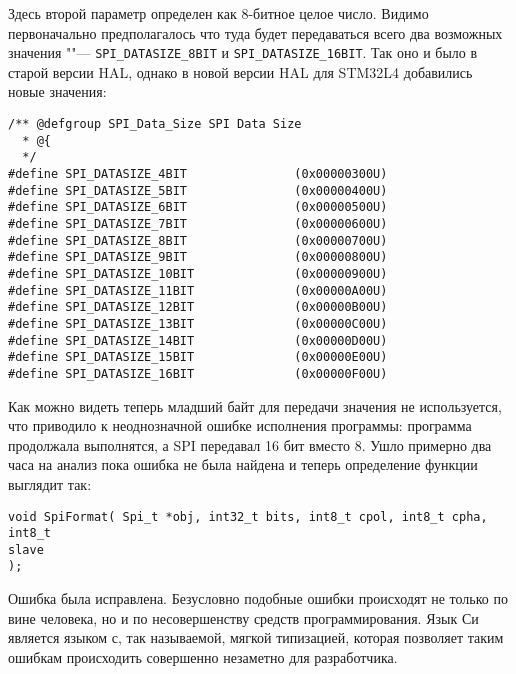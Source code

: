 Здесь второй параметр определен как 8-битное целое число. 
Видимо первоначально предполагалось что туда будет передаваться всего два 
возможных значения ""--- \texttt{SPI\_DATASIZE\_8BIT} и 
\texttt{SPI\_DATASIZE\_16BIT}.
Так оно и было в старой версии HAL, однако в новой версии HAL для STM32L4 
добавились новые значения:

\begin{verbatim}
/** @defgroup SPI_Data_Size SPI Data Size            
  * @{                                               
  */                                                 
#define SPI_DATASIZE_4BIT               (0x00000300U)
#define SPI_DATASIZE_5BIT               (0x00000400U)
#define SPI_DATASIZE_6BIT               (0x00000500U)
#define SPI_DATASIZE_7BIT               (0x00000600U)
#define SPI_DATASIZE_8BIT               (0x00000700U)
#define SPI_DATASIZE_9BIT               (0x00000800U)
#define SPI_DATASIZE_10BIT              (0x00000900U)
#define SPI_DATASIZE_11BIT              (0x00000A00U)
#define SPI_DATASIZE_12BIT              (0x00000B00U)
#define SPI_DATASIZE_13BIT              (0x00000C00U)
#define SPI_DATASIZE_14BIT              (0x00000D00U)
#define SPI_DATASIZE_15BIT              (0x00000E00U)
#define SPI_DATASIZE_16BIT              (0x00000F00U)
\end{verbatim}

Как можно видеть теперь младший байт для передачи значения не используется, что 
приводило к неоднозначной ошибке исполнения программы: программа продолжала 
выполнятся, а SPI передавал 16 бит вместо 8. 
Ушло примерно два часа на анализ пока ошибка не была найдена и теперь 
определение функции выглядит так:

\begin{verbatim}
void SpiFormat( Spi_t *obj, int32_t bits, int8_t cpol, int8_t cpha, int8_t 
slave 
);
\end{verbatim}

Ошибка была исправлена. 
Безусловно подобные ошибки происходят не только по вине человека, но и по 
несовершенству средств программирования.
Язык Си является языком с, так называемой, мягкой типизацией, которая позволяет 
таким ошибкам происходить совершенно незаметно для разработчика.





